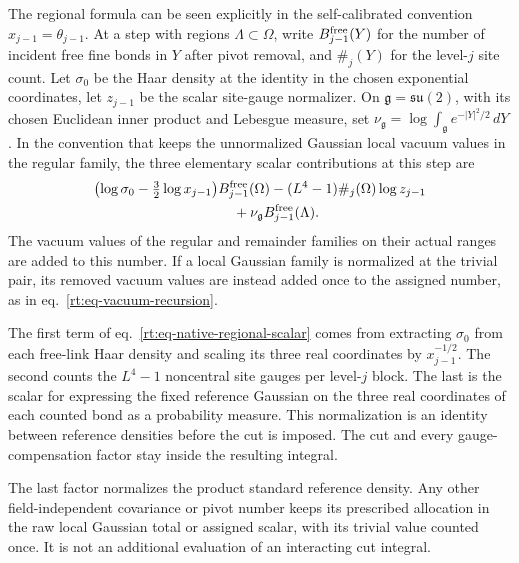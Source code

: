 \documentclass[11pt,letterpaper,reqno]{amsart}
\numberwithin{equation}{section}
\renewcommand{\eqref}[1]{\textup{eq.~\ref{#1}}}
\theoremstyle{definition}
\theoremstyle{remark}
\begin{document}
The regional formula can be seen explicitly in the
self-calibrated convention \(x_{j-1}=\theta_{j-1}\). At a
step with regions \(\Lambda\subset\Omega\), write \(B_{j-1}^{\rm free}(Y)\)
for the number of incident free fine bonds in \(Y\) after
pivot removal, and \(\#_j(Y)\) for the level-\(j\) site
count. Let \(\sigma_0\) be the Haar density at the identity
in the chosen exponential coordinates, let \(z_{j-1}\) be
the scalar site-gauge normalizer. On $\mathfrak g=\mathfrak{su}(2)$,
with its chosen Euclidean inner product and Lebesgue measure, set
\(\nu_{\mathfrak g}=\log\int_{\mathfrak g}e^{-|Y|^2/2}\,dY\).
In the convention
that keeps the unnormalized Gaussian local vacuum values in
the regular family, the three elementary scalar contributions at this
step are
\begin{equation}\label{rt:eq-native-regional-scalar}
 \begin{aligned}
 &\bigl(\log\sigma_0-\tfrac32\log x_{j-1}\bigr)B_{j-1}^{\rm free}(\Omega)
        -(L^4-1)\#_j(\Omega)\log z_{j-1}\\
 &\hspace{35mm}+\nu_{\mathfrak g}B_{j-1}^{\rm free}(\Lambda).
 \end{aligned}
\end{equation}
The vacuum values of the regular and remainder families on
their actual ranges are added to this number. If a local
Gaussian family is normalized at the trivial pair, its
removed vacuum values are instead added once to the assigned
number, as in \eqref{rt:eq-vacuum-recursion}.

The first term of \eqref{rt:eq-native-regional-scalar}
comes from extracting \(\sigma_0\) from each free-link Haar
density and scaling its three real coordinates by
\(x_{j-1}^{-1/2}\). The second counts the \(L^4-1\)
noncentral site gauges per level-\(j\) block. The last is
the scalar for expressing the fixed reference Gaussian on the
three real coordinates of each counted bond as a probability measure.
This normalization is an identity between reference densities
before the cut is imposed. The cut and every
gauge-compensation factor stay inside the resulting integral.

The last factor normalizes the product standard reference density.
Any other field-independent covariance or pivot number keeps its
prescribed allocation in the raw local Gaussian total or assigned
scalar, with its trivial value counted once. It is not an additional
evaluation of an interacting cut integral.
\end{document}
